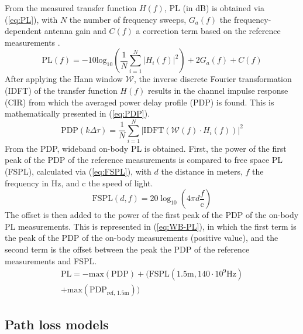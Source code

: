 \documentclass[preprint]{rsl}
\begin{document}
From the measured transfer function $H(f)$, PL (in dB) is obtained via (\ref{eq:PL}), with $N$ the number of frequency sweeps, $G_a(f)$ the frequency-dependent antenna gain and $C(f)$ a correction term based on the reference measurements \cite{DeBeelde2021_eucap}.
\begin{equation}
\label{eq:PL}
\text{PL}(f)= -10 \text{log}_{10} \left( \frac{1}{N} \sum_{i=1}^N | H_i(f) |^2 \right) + 2 G_a(f) + C(f)
\end{equation}
After applying the Hann window $\mathcal{W}$, the inverse discrete Fourier transformation (IDFT) of the transfer function $H(f)$ results in the channel impulse response (CIR) from which the averaged power delay profile (PDP) is found. 
This is mathematically presented in (\ref{eq:PDP}).
\begin{equation}
\text{PDP}(k\Delta\tau) = \frac{1}{N} \sum_{i=1}^N | \text{IDFT}(\mathcal{W}(f) \cdot H_i(f)) |^2
\label{eq:PDP}
\end{equation}
From the PDP, wideband on-body PL is obtained. 
First, the power of the first peak of the PDP of the reference measurements is compared to free space PL (FSPL), calculated via (\ref{eq:FSPL}), with $d$ the distance in meters, $f$ the frequency in Hz, and c the speed of light. 
\begin{equation}
\text{FSPL}(d,f)= 20 \log_{10} \left( 4 \pi d \frac{f}{\text{c}}\right)
\label{eq:FSPL}
\end{equation}
The offset is then added to the power of the first peak of the PDP of the on-body PL measurements. 
This is represented in (\ref{eq:WB-PL}), in which the first term is the peak of the PDP of the on-body measurements (positive value), and the second term is the offset between the peak the PDP of the reference measurements and FSPL.
\begin{multline}
\text{PL} = - \text{max}(\text{PDP})  + (\text{FSPL}(1.5 \text{m}, 140\cdot10^9 \text{Hz}) \\ + \text{max}(\text{PDP}_\text{ref, 1.5m}) )
\label{eq:WB-PL}
\end{multline}

\subsection{Path loss models}
\end{document}
